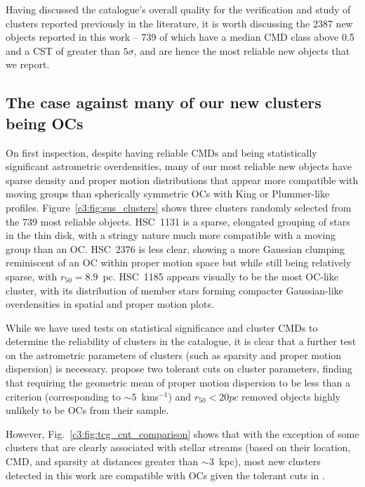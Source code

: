 Having discussed the catalogue's overall quality for the verification and study of clusters reported previously in the literature, it is worth discussing the 2387 new objects reported in this work -- 739 of which have a median CMD class above 0.5 and a CST of greater than $5\sigma$, and are hence the most reliable new objects that we report.

\subsection{The case against many of our new clusters being OCs}

On first inspection, despite having reliable CMDs and being statistically significant astrometric overdensities, many of our most reliable new objects have sparse density and proper motion distributions that appear more compatible with moving groups than spherically symmetric OCs with King \citep{king_structure_star_1962} or Plummer-like \citep{plummer_problem_1911} profiles. Figure~\ref{c3:fig:sus_clusters} shows three clusters randomly selected from the 739 most reliable objects. HSC~1131 is a sparse, elongated grouping of stars in the thin disk, with a stringy nature much more compatible with a moving group than an OC. HSC~2376 is less clear, showing a more Gaussian clumping reminiscent of an OC within proper motion space but while still being relatively sparse, with $r_{50} = 8.9$~pc. HSC~1185 appears visually to be the most OC-like cluster, with its distribution of member stars forming compacter Gaussian-like overdensities in spatial and proper motion plots.

While we have used tests on statistical significance and cluster CMDs to determine the reliability of clusters in the catalogue, it is clear that a further test on the astrometric parameters of clusters (such as sparsity and proper motion dispersion) is necessary. \cite{cantat-gaudin_clusters_2020} propose two tolerant cuts on cluster parameters, finding that requiring the geometric mean of proper motion dispersion to be less than a criterion (corresponding to $\sim 5$~kms$^{-1}$) and $r_{50} < 20pc$ removed objects highly unlikely to be OCs from their sample.

However, Fig.~\ref{c3:fig:tcg_cut_comparison} shows that with the exception of some clusters that are clearly associated with stellar streams (based on their location, CMD, and sparsity at distances greater than $\sim 3$~kpc), most new clusters detected in this work are compatible with OCs given the tolerant cuts in \cite{cantat-gaudin_clusters_2020}.

